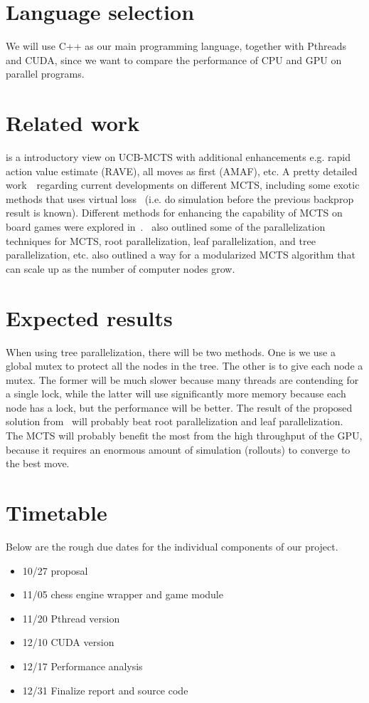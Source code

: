 \documentclass[sigconf]{acmart}
\begin{document}
\section{Language selection}
We will use C++ as our main programming language, together with Pthreads and CUDA, since we want to compare the performance of CPU and GPU on parallel programs. 

\section{Related work}
\cite{appplMCTS} is a introductory view on UCB-MCTS with additional enhancements e.g. rapid action value estimate (RAVE), all moves as first (AMAF), etc. A pretty detailed work~\cite{liu2020effective}~regarding current developments on different MCTS, including some exotic methods that uses virtual loss~\cite{Liu2020Watch} (i.e. do simulation before the previous backprop result is known). Different methods for enhancing the capability of MCTS on board games were explored in~\cite{weigel2017monte}.~\cite{guillaumeMCTS}\cite{weigel2017monte} also outlined some of the parallelization techniques for MCTS, root parallelization, leaf parallelization, and tree parallelization, etc. \cite{weigel2017monte} also outlined a way for a modularized MCTS algorithm that can scale up as the number of computer nodes grow. 

\section{Expected results}
When using tree parallelization, there will be two methods. One is we use a global mutex to protect all the nodes in the tree. The other is to give each node a mutex. The former will be much slower because many threads are contending for a single lock, while the latter will use significantly more memory because each node has a lock, but the performance will be better. The result of the proposed solution from~\cite{Liu2020Watch} will probably beat root parallelization and leaf parallelization.\\
The MCTS will probably benefit the most from the high throughput of the GPU, because it requires an enormous amount of simulation (rollouts) to converge to the best move.

\section{Timetable}
Below are the rough due dates for the individual components of our project. 
\begin{itemize}
  \item 10/27 proposal
  \item 11/05 chess engine wrapper and game module
  \item 11/20 Pthread version
  \item 12/10 CUDA version
  \item 12/17 Performance analysis
  \item 12/31 Finalize report and source code
  
\end{itemize}
\end{document}
